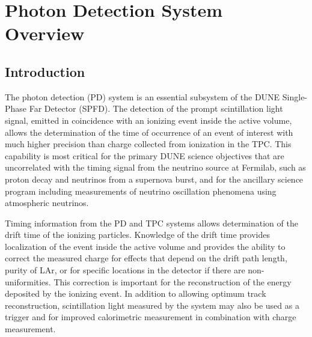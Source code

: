 \section{Photon Detection System Overview}
\label{sec:fdsp-pd-ov}


\subsection{Introduction}
\label{sec:fdsp-pd-intro}


The photon detection (PD) system is an essential subsystem of the DUNE Single-Phase Far Detector (SPFD). The detection of the prompt scintillation light signal, emitted in coincidence with an ionizing event inside the active volume, allows the determination of the time of occurrence of an event of interest with much higher precision than charge collected from ionization in the TPC. This capability is most critical for the primary DUNE science objectives that are uncorrelated with the timing signal from the neutrino source at Fermilab, such as proton decay and neutrinos from a supernova burst, and for the ancillary science program including measurements of neutrino oscillation phenomena using atmospheric neutrinos.

Timing information from the PD and TPC systems allows determination of the drift time of the ionizing particles. Knowledge of the drift time provides localization of the event inside the active volume and provides the ability to correct the measured charge for effects that depend on the drift path length, purity of LAr, or for specific locations in the detector if there are non-uniformities.  This correction is important for the reconstruction of the energy deposited by the ionizing event. In addition to allowing optimum track reconstruction, scintillation light measured by the system may also be used as a trigger and for improved calorimetric measurement in combination with charge measurement.

